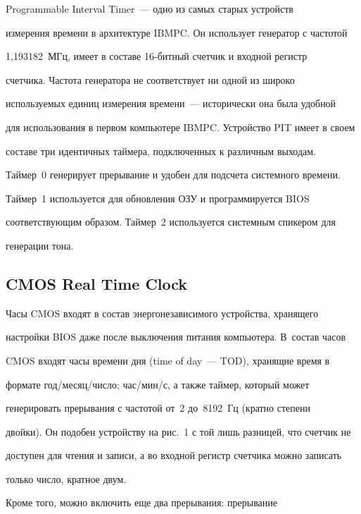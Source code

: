      Programmable Interval Timer~--- одно из самых старых устройств 


измерения времени в архитектуре IBMPC. Он использует генератор с частотой 


1,193182~МГц, имеет в составе 16-бит\-ный счетчик и входной регистр 


счетчика. Частота генератора не соответствует ни одной из широко 


используемых единиц измерения времени~--- исторически она была удобной 


для использования в первом компьютере IBMPC. Устройство PIT имеет в своем 


составе три идентичных таймера, подключенных к различным выходам. 


Таймер~0 генерирует прерывание и удобен для подсчета системного времени. 


Таймер~1 используется для обновления ОЗУ и программируется BIOS 


соответствующим образом. Таймер~2 используется системным спикером для 


генерации тона.





\subsection{CMOS Real Time Clock}





     Часы CMOS входят в состав энергонезависимого устройства, хранящего 


настройки BIOS даже после выключения питания компьютера. В~состав часов 


CMOS входят часы времени дня (time of day~--- TOD), хранящие время в 


формате год/месяц/число; час/мин/с, а также таймер, который может 


генерировать прерывания с частотой от~2 до~8192~Гц (кратно степени 


двойки). Он подобен устройству на рис.~1 с той лишь разницей, что счетчик не 


доступен для чтения и записи, а во входной регистр счетчика можно записать 


только число, кратное двум.


     


     Кроме того, можно включить еще два прерывания: прерывание 


